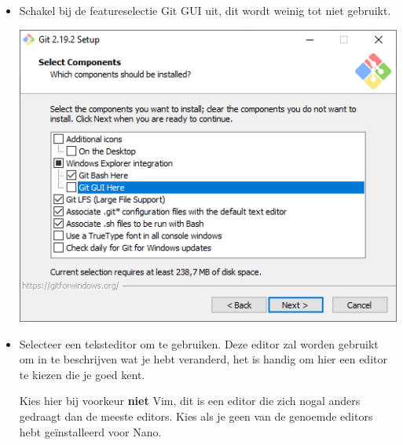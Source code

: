 \documentclass[a4paper]{extarticle}
\begin{document}
\begin{itemize}
	\item Schakel bij de featureselectie Git GUI uit, dit wordt weinig tot niet gebruikt.

		\begin{center}
			\includegraphics[width=0.75\linewidth]{windows-screenshots/1}
		\end{center}

		\newpage

	\item Selecteer een teksteditor om te gebruiken. Deze editor zal worden gebruikt om in te beschrijven wat je hebt
		veranderd, het is handig om hier een editor te kiezen die je goed kent.

		Kies hier bij voorkeur \textbf{niet} Vim, dit is een editor die zich nogal anders gedraagt dan de meeste
		editors. Kies als je geen van de genoemde editors hebt geïnstalleerd voor Nano.


\end{itemize}
\end{document}
